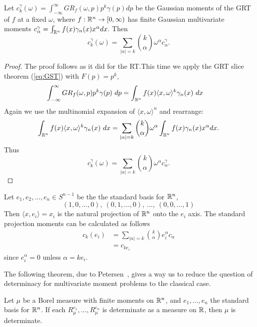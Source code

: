 \begin{proposition}
  Let $c_k^\gamma(\omega) = \int_{-\infty}^\infty GR_f(\omega, p) p^k \gamma(p) dp$ be the Gaussian moments of the GRT of $f$ at a fixed $\omega$, where $f:\mathbb{R}^n \to [0, \infty)$ has finite Gaussian multivariate moments $c^\gamma_\alpha = \int_{\mathbb{R}^n} f(x) \gamma_n(x) x^\alpha dx$. Then
  \[
    c^\gamma_k(\omega) 
    = \sum_{|\alpha| = k}\binom{k}{\alpha} \omega^\alpha c^\gamma_\alpha.
  \]
\end{proposition}


\begin{proof}
  The proof follows as it did for the RT.\@ This time we apply the GRT slice theorem (\ref{eq:GST}) with $F(p) = p^k$, 
  \begin{align*}
    \int_{-\infty}^\infty GR_f(\omega, p) p^k \gamma(p) ~dp
    &= \int_{\mathbb{R}^n} f(x) \langle x, \omega \rangle^k \gamma_n(x) ~dx
  \end{align*}
  Again we use the multinomial expansion of $\langle x, \omega\rangle^n$ and rearrange:
  \[
    \int_{\mathbb{R}^n} f(x) \langle x, \omega \rangle^k \gamma_n(x) ~dx
    = \sum_{|\alpha| = k} \binom{k}{\alpha} \omega^\alpha \int_{\mathbb{R}^n} f(x) \gamma_n(x)x^\alpha dx. 
  \]
  Thus
  \[
    c^\gamma_k(\omega) = \sum_{|\alpha| = k} \binom{k}{\alpha} \omega^\alpha c^\gamma_\alpha.
  \]
\end{proof}

\begin{myexample}
  Let $e_1, e_2, \ldots, e_n \in S^{n-1}$ be the the standard basis for $\mathbb{R}^n$,
  \[
    (1, 0, \ldots, 0),~ (0, 1, \ldots, 0),~ \ldots,~ (0,0, \ldots, 1)
  \]
  Then $\langle x, e_i \rangle = x_i$ is the natural projection of $\mathbb{R}^n$ onto the $e_i$ axis. The standard projection moments can be calculated as follows
  \begin{align*}
    c_k(e_i) 
    &= \sum_{|\alpha| = k} \binom{k}{\alpha} e_i^\alpha c_\alpha \\
    &= c_{ke_i}
  \end{align*}
  since $e_i^\alpha = 0$ unless $\alpha = ke_i$. 
\end{myexample}

The following theorem, due to Petersen~\cite{Pete82}, gives a way us to reduce the question of determinacy for multivariate moment problems to the classical case.

\begin{proposition}
  Let $\mu$ be a Borel measure with finite moments on $\mathbb{R}^n$, and $e_1, \ldots, e_n$ the standard basis for $\mathbb{R}^n$. If each $R_\mu^{e_1}, \ldots, R_\mu^{e_n}$ is determinate as a measure on $\mathbb{R}$, then $\mu$ is determinate.
\end{proposition}

